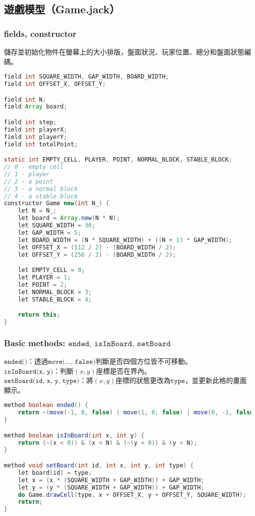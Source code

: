 \documentclass[pstricks, 12pt, a4paper]{article}
\begin{document}
  \subsection{遊戲模型（Game.jack）}
    \subsubsection{fields, constructor}
      儲存並初始化物件在螢幕上的大小排版，盤面狀況、玩家位置、總分和盤面狀態編碼。
      \begin{lstlisting}[language=Java, frame=single]
field int SQUARE_WIDTH, GAP_WIDTH, BOARD_WIDTH;
field int OFFSET_X, OFFSET_Y;

field int N;
field Array board;

field int step;
field int playerX;
field int playerY;
field int totalPoint;

static int EMPTY_CELL, PLAYER, POINT, NORMAL_BLOCK, STABLE_BLOCK;
// 0 - empty cell
// 1 - player
// 2 - a point
// 3 - a normal block
// 4 - a stable block
constructor Game new(int N_) {
    let N = N_;
    let board = Array.new(N * N);
    let SQUARE_WIDTH = 30;
    let GAP_WIDTH = 5;
    let BOARD_WIDTH = (N * SQUARE_WIDTH) + ((N + 1) * GAP_WIDTH);
    let OFFSET_X = (512 / 2) - (BOARD_WIDTH / 2);
    let OFFSET_Y = (256 / 2) - (BOARD_WIDTH / 2);

    let EMPTY_CELL = 0;
    let PLAYER = 1;
    let POINT = 2;
    let NORMAL_BLOCK = 3;
    let STABLE_BLOCK = 4;

    return this;
}
      \end{lstlisting}
    \subsubsection{Basic methods: $\texttt{ended, isInBoard, setBoard}$}
      \noindent $\texttt{ended()}$：透過$\texttt{move(..., false)}$判斷是否四個方位皆不可移動。\\
      $\texttt{isInBoard(x, y)}$：判斷$(x, y)$座標是否在界內。\\
      $\texttt{setBoard(id, x, y, type)}$：將$(x, y)$座標的狀態更改為$\texttt{type}$，並更新此格的畫面顯示。
      \begin{lstlisting}[language=Java, frame=single]
method boolean ended() {
    return ~(move(-1, 0, false) | move(1, 0, false) | move(0, -1, false) | move(0, 1, false));
}

method boolean isInBoard(int x, int y) {
    return (~(x < 0)) & (x < N) & (~(y < 0)) & (y < N);
}

method void setBoard(int id, int x, int y, int type) {
    let board[id] = type;
    let x = (x * (SQUARE_WIDTH + GAP_WIDTH)) + GAP_WIDTH;
    let y = (y * (SQUARE_WIDTH + GAP_WIDTH)) + GAP_WIDTH;
    do Game.drawCell(type, x + OFFSET_X, y + OFFSET_Y, SQUARE_WIDTH);
    return;
}
      \end{lstlisting}
\end{document}
